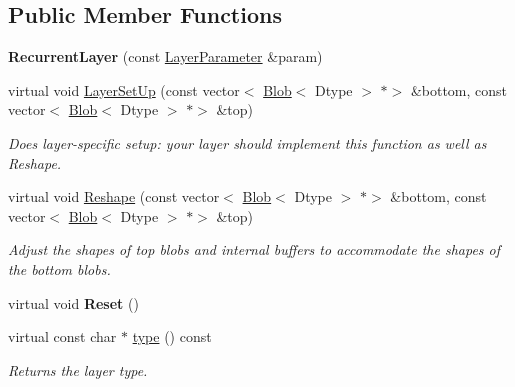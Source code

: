 \subsection*{Public Member Functions}
\begin{DoxyCompactItemize}
\item 
\mbox{\label{classcaffe_1_1_recurrent_layer_a3f02919dbb32c07c89bfda4ea68c09df}} 
{\bfseries Recurrent\+Layer} (const \mbox{\hyperlink{classcaffe_1_1_layer_parameter}{Layer\+Parameter}} \&param)
\item 
virtual void \mbox{\hyperlink{classcaffe_1_1_recurrent_layer_a4eec13bfbe23b1e3eb2bbc4652bd6952}{Layer\+Set\+Up}} (const vector$<$ \mbox{\hyperlink{classcaffe_1_1_blob}{Blob}}$<$ Dtype $>$ $\ast$$>$ \&bottom, const vector$<$ \mbox{\hyperlink{classcaffe_1_1_blob}{Blob}}$<$ Dtype $>$ $\ast$$>$ \&top)
\begin{DoxyCompactList}\small\item\em Does layer-\/specific setup\+: your layer should implement this function as well as Reshape. \end{DoxyCompactList}\item 
virtual void \mbox{\hyperlink{classcaffe_1_1_recurrent_layer_aba6011a9cbb18e38a8596aa5dbb44723}{Reshape}} (const vector$<$ \mbox{\hyperlink{classcaffe_1_1_blob}{Blob}}$<$ Dtype $>$ $\ast$$>$ \&bottom, const vector$<$ \mbox{\hyperlink{classcaffe_1_1_blob}{Blob}}$<$ Dtype $>$ $\ast$$>$ \&top)
\begin{DoxyCompactList}\small\item\em Adjust the shapes of top blobs and internal buffers to accommodate the shapes of the bottom blobs. \end{DoxyCompactList}\item 
\mbox{\label{classcaffe_1_1_recurrent_layer_a9f0bf24a571da40f490b9b78a51d9393}} 
virtual void {\bfseries Reset} ()
\item 
\mbox{\label{classcaffe_1_1_recurrent_layer_afc0b925b8bf94a795c9ff84f411e70a3}} 
virtual const char $\ast$ \mbox{\hyperlink{classcaffe_1_1_recurrent_layer_afc0b925b8bf94a795c9ff84f411e70a3}{type}} () const
\begin{DoxyCompactList}\small\item\em Returns the layer type. \end{DoxyCompactList}\item 

\end{DoxyCompactItemize}
